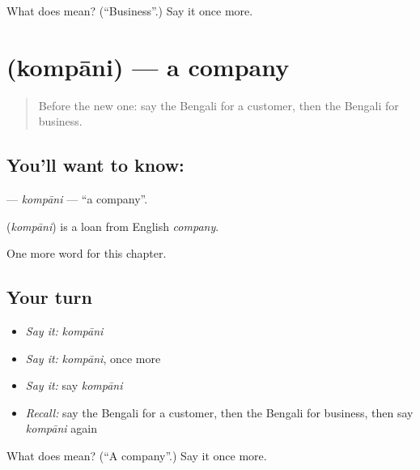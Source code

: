\begin{tcolorbox}[breakable,colback=teal!4,colframe=teal!35!black,title={Before you move on}]
What does  mean? (\textquotedblleft{}Business\textquotedblright{}.) Say it once more.
\end{tcolorbox}
\section[\texorpdfstring{\bn{কোম্পানি} (kompāni)}{কোম্পানি (kompāni)}]{ (kompāni) — a company}

\label{lesson:BN-C207-kompani}



\begin{quote}
Before the new one: say the Bengali for a customer, then the Bengali for business.
\end{quote}

\subsection*{You'll want to know: }
\textbf{} — \emph{kompāni} — \textquotedblleft{}a company\textquotedblright{}.

\begin{cousinweb}
\textbf{} (\emph{kompāni}) is a loan from English \emph{company}.
\end{cousinweb}

\begin{grammarlens}[title={What you've built}]
One more word for this chapter.
\end{grammarlens}

\subsection*{Your turn}
\begin{itemize}
\raggedright
  \item \emph{Say it:} \emph{kompāni}
  \item \emph{Say it:} \emph{kompāni}, once more
  \item \emph{Say it:} say \emph{kompāni}
  \item \emph{Recall:} say the Bengali for a customer, then the Bengali for business, then say \emph{kompāni} again
\end{itemize}

\begin{tcolorbox}[breakable,colback=teal!4,colframe=teal!35!black,title={Before you move on}]
What does  mean? (\textquotedblleft{}A company\textquotedblright{}.) Say it once more.
\end{tcolorbox}

